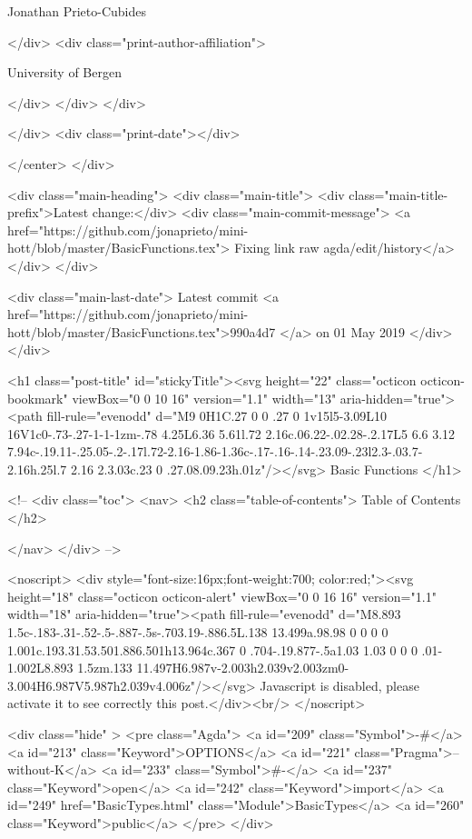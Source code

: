                   Jonathan Prieto-Cubides
                
              </div>
              <div class="print-author-affiliation">
                
                  University of Bergen
                
                </div>
            </div>
          </div>
          
          
        </div>
        <div class="print-date"></div>
        
        
    </center>
  </div>

  
  <div class="main-heading">
    <div class="main-title">
      <div class="main-title-prefix">Latest change:</div>
      <div class="main-commit-message">
            <a href="https://github.com/jonaprieto/mini-hott/blob/master/BasicFunctions.tex">
              Fixing link raw agda/edit/history</a>
      </div>
    </div>

    <div class="main-last-date">
      Latest commit <a href="https://github.com/jonaprieto/mini-hott/blob/master/BasicFunctions.tex">990a4d7 </a> on  01 May 2019
    </div>
  </div>
  
  <h1 class="post-title" id="stickyTitle"><svg height="22" class="octicon octicon-bookmark" viewBox="0 0 10 16" version="1.1" width="13" aria-hidden="true"><path fill-rule="evenodd" d="M9 0H1C.27 0 0 .27 0 1v15l5-3.09L10 16V1c0-.73-.27-1-1-1zm-.78 4.25L6.36 5.61l.72 2.16c.06.22-.02.28-.2.17L5 6.6 3.12 7.94c-.19.11-.25.05-.2-.17l.72-2.16-1.86-1.36c-.17-.16-.14-.23.09-.23l2.3-.03.7-2.16h.25l.7 2.16 2.3.03c.23 0 .27.08.09.23h.01z"/></svg> Basic Functions
  </h1>

  <!-- 
  <div class="toc">
    <nav>
    <h2 class="table-of-contents"> Table of Contents </h2>
      

    </nav>
  </div>
   -->

  <noscript>
  <div style="font-size:16px;font-weight:700; color:red;"><svg height="18" class="octicon octicon-alert" viewBox="0 0 16 16" version="1.1" width="18" aria-hidden="true"><path fill-rule="evenodd" d="M8.893 1.5c-.183-.31-.52-.5-.887-.5s-.703.19-.886.5L.138 13.499a.98.98 0 0 0 0 1.001c.193.31.53.501.886.501h13.964c.367 0 .704-.19.877-.5a1.03 1.03 0 0 0 .01-1.002L8.893 1.5zm.133 11.497H6.987v-2.003h2.039v2.003zm0-3.004H6.987V5.987h2.039v4.006z"/></svg> Javascript is disabled, please activate it to see correctly this post.</div><br/>
  </noscript>

  <div class="hide" >
<pre class="Agda">
<a id="209" class="Symbol">{-#</a> <a id="213" class="Keyword">OPTIONS</a> <a id="221" class="Pragma">--without-K</a> <a id="233" class="Symbol">#-}</a>
<a id="237" class="Keyword">open</a> <a id="242" class="Keyword">import</a> <a id="249" href="BasicTypes.html" class="Module">BasicTypes</a> <a id="260" class="Keyword">public</a>
</pre>
</div>

